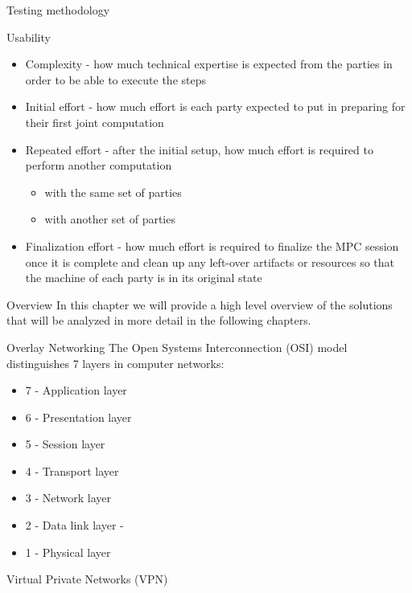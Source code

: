 \begin{frame}{Testing methodology}
\begin{block}{Usability}
\begin{itemize}
\tightlist
\item
  Complexity - how much technical expertise is expected from the parties
  in order to be able to execute the steps
\item
  Initial effort - how much effort is each party expected to put in
  preparing for their first joint computation
\item
  Repeated effort - after the initial setup, how much effort is required
  to perform another computation

  \begin{itemize}
  \tightlist
  \item
    with the same set of parties
  \item
    with another set of parties
  \end{itemize}
\item
  Finalization effort - how much effort is required to finalize the MPC
  session once it is complete and clean up any left-over artifacts or
  resources so that the machine of each party is in its original state
\end{itemize}
\end{block}
\end{frame}

\begin{frame}{Overview}
\protect\hypertarget{overview}{}
In this chapter we will provide a high level overview of the solutions
that will be analyzed in more detail in the following chapters.

\begin{block}{Overlay Networking}
\protect\hypertarget{overlay-networking}{}
The Open Systems Interconnection (OSI) model distinguishes 7 layers in
computer networks:

\begin{itemize}
\tightlist
\item
  7 - Application layer
\item
  6 - Presentation layer
\item
  5 - Session layer
\item
  4 - Transport layer
\item
  3 - Network layer
\item
  2 - Data link layer -
\item
  1 - Physical layer
\end{itemize}
\end{block}

\begin{block}{Virtual Private Networks (VPN)}
\protect\hypertarget{virtual-private-networks-vpn}{}
\end{block}
\end{frame}

